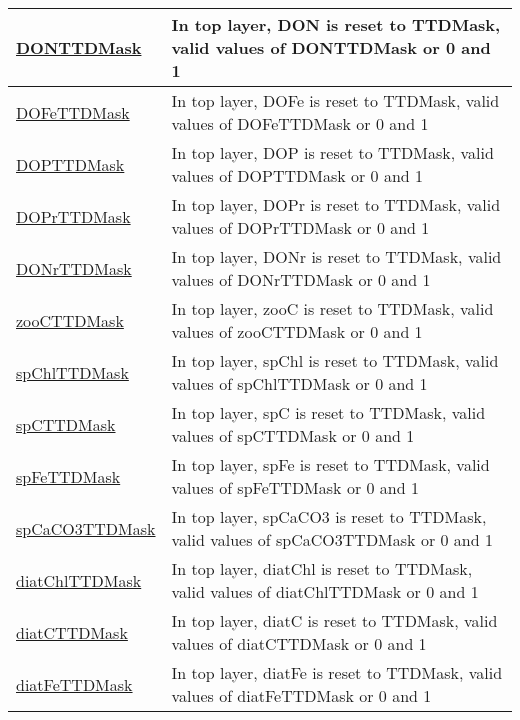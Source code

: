 {\begin{center}
\begin{longtable}{| p{2.0in} | p{4.0in} |}
    \hline
    \hyperref[subsec:var_sec_tracersTTDFields_DONTTDMask]{DONTTDMask} & In top layer, DON is reset to TTDMask, valid values of DONTTDMask or 0 and 1 \\
    \hline
    \hyperref[subsec:var_sec_tracersTTDFields_DOFeTTDMask]{DOFeTTDMask} & In top layer, DOFe is reset to TTDMask, valid values of DOFeTTDMask or 0 and 1 \\
    \hline
    \hyperref[subsec:var_sec_tracersTTDFields_DOPTTDMask]{DOPTTDMask} & In top layer, DOP is reset to TTDMask, valid values of DOPTTDMask or 0 and 1 \\
    \hline
    \hyperref[subsec:var_sec_tracersTTDFields_DOPrTTDMask]{DOPrTTDMask} & In top layer, DOPr is reset to TTDMask, valid values of DOPrTTDMask or 0 and 1 \\
    \hline
    \hyperref[subsec:var_sec_tracersTTDFields_DONrTTDMask]{DONrTTDMask} & In top layer, DONr is reset to TTDMask, valid values of DONrTTDMask or 0 and 1 \\
    \hline
    \hyperref[subsec:var_sec_tracersTTDFields_zooCTTDMask]{zooCTTDMask} & In top layer, zooC is reset to TTDMask, valid values of zooCTTDMask or 0 and 1 \\
    \hline
    \hyperref[subsec:var_sec_tracersTTDFields_spChlTTDMask]{spChlTTDMask} & In top layer, spChl is reset to TTDMask, valid values of spChlTTDMask or 0 and 1 \\
    \hline
    \hyperref[subsec:var_sec_tracersTTDFields_spCTTDMask]{spCTTDMask} & In top layer, spC is reset to TTDMask, valid values of spCTTDMask or 0 and 1 \\
    \hline
    \hyperref[subsec:var_sec_tracersTTDFields_spFeTTDMask]{spFeTTDMask} & In top layer, spFe is reset to TTDMask, valid values of spFeTTDMask or 0 and 1 \\
    \hline
    \hyperref[subsec:var_sec_tracersTTDFields_spCaCO3TTDMask]{spCaCO3TTDMask} & In top layer, spCaCO3 is reset to TTDMask, valid values of spCaCO3TTDMask or 0 and 1 \\
    \hline
    \hyperref[subsec:var_sec_tracersTTDFields_diatChlTTDMask]{diatChlTTDMask} & In top layer, diatChl is reset to TTDMask, valid values of diatChlTTDMask or 0 and 1 \\
    \hline
    \hyperref[subsec:var_sec_tracersTTDFields_diatCTTDMask]{diatCTTDMask} & In top layer, diatC is reset to TTDMask, valid values of diatCTTDMask or 0 and 1 \\
    \hline
    \hyperref[subsec:var_sec_tracersTTDFields_diatFeTTDMask]{diatFeTTDMask} & In top layer, diatFe is reset to TTDMask, valid values of diatFeTTDMask or 0 and 1 \\

\end{longtable}
\end{center}}
